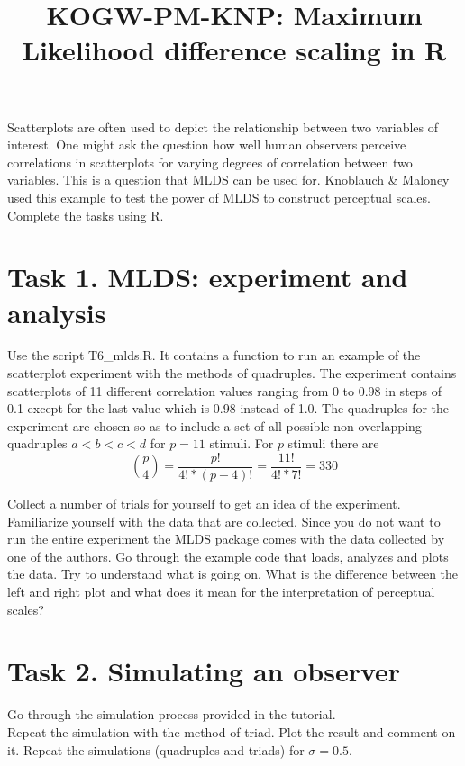\documentclass[12pt,english]{scrartcl}
\title{KOGW-PM-KNP: Maximum Likelihood difference scaling in R}
\begin{document}
\maketitle

Scatterplots are often used to depict the relationship between two variables of interest. One might ask the question how well human observers perceive correlations in scatterplots  for varying degrees of correlation between two variables. This is a question that MLDS can be used for. Knoblauch \& Maloney used this example to test the power of MLDS to construct perceptual scales. Complete the tasks using R. 

\section*{Task 1. MLDS: experiment and analysis}
Use the script T6\_mlds.R. It contains a function to run an example of the scatterplot experiment with the methods of quadruples. The experiment contains scatterplots of 11 different correlation values ranging from 0 to 0.98 in steps of 0.1 except for the last value which is 0.98 instead of 1.0. 
The quadruples for the experiment are chosen so as to include a set of all possible non-overlapping quadruples $a<b<c<d$ for $p=11$ stimuli. For $p$ stimuli there are 
$$\binom{p}{4} = \frac{p!}{4!*(p-4)!} = \frac{11!}{4!*7!}=330$$ 

Collect a number of trials for yourself to get an idea of the experiment. Familiarize yourself with the data that are collected. Since you do not want to run the entire experiment the MLDS package comes with the data collected by one of the authors. Go through the example code that loads, analyzes and plots the data. Try to understand what is going on. What is the difference between the left and right plot and what does it mean for the interpretation of perceptual scales? 


\section*{Task 2. Simulating an observer}
Go through the simulation process provided in the tutorial. \\
Repeat the simulation with the method of triad. Plot the result and comment on it. Repeat the simulations (quadruples and triads) for $\sigma = 0.5$.
\end{document}
